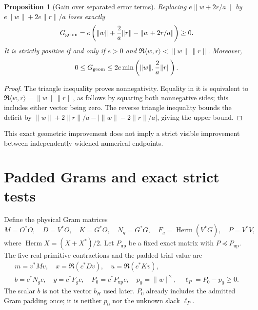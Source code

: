 \documentclass[11pt,a4paper]{article}
\newcommand{\Herm}{\operatorname{Herm}}
\newcommand{\ip}[2]{\langle #1,#2\rangle}
\newcommand{\norm}[1]{\lVert #1\rVert}
\newcommand{\Pup}{P_{\mathrm{up}}}
\newtheorem{proposition}[theorem]{Proposition}
\theoremstyle{definition}
\theoremstyle{remark}
\numberwithin{equation}{section}
\begin{document}
\begin{proposition}[Gain over separated error terms]\label{prop:gain}
Replacing $e\norm{w+2r/a}$ by
$e\norm w+2e\norm r/a$ loses exactly
\[
 G_{\rm geom}=e\left(\norm w+\frac2a\norm r
                             -\norm{w+2r/a}\right)\ge0.
\]
It is strictly positive if and only if
$e>0$ and $\Re\ip wr<\norm w\,\norm r$. Moreover,
\[
 0\le G_{\rm geom}\le
 2e\min\left(\norm w,\frac2a\norm r\right).
\]
\end{proposition}
\begin{proof}
The triangle inequality proves nonnegativity. Equality in it is equivalent
to $\Re\ip wr=\norm w\,\norm r$, as follows by squaring both nonnegative
sides; this includes either vector being zero. The reverse triangle
inequality bounds the deficit by
$\norm w+2\norm r/a-|\norm w-2\norm r/a|$, giving the upper bound.
\end{proof}
This exact geometric improvement does not imply a strict visible
improvement between independently widened numerical endpoints.

\section{Padded Grams and exact strict tests}\label{sec:cap}

Define the physical Gram matrices
\begin{equation}\label{eq:grams}
 M=O^*O,\quad D=V^*O,\quad K=G^*O,\quad
 N_g=G^*G,\quad F_g=\Herm(V^*G),\quad P=V^*V,
\end{equation}
where $\Herm X=(X+X^*)/2$. Let $\Pup$ be a fixed exact matrix with
$P\preceq\Pup$. The five real primitive contractions and the padded
trial value are
\begin{equation}\label{eq:scalars}
\begin{gathered}
 m=v^*Mv,\quad x=\Re(c^*Dv),\quad u=\Re(c^*Kv),\\
 b=c^*N_gc,\quad y=c^*F_gc,\quad
 P_0=c^*\Pup c,\quad p_0=\norm w^2,\quad
 \ell_P=P_0-p_0\ge0.
\end{gathered}
\end{equation}
The scalar $b$ is not the vector $b_H$ used later.
$P_0$ already includes the admitted Gram padding once; it is neither
$p_0$ nor the unknown slack $\ell_P$.
\end{document}
